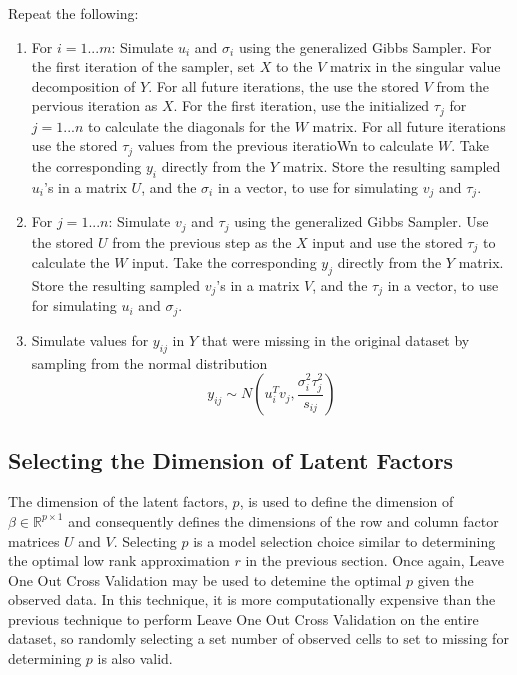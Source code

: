 \documentclass[12pt,twoside]{dukestatscithesis}
\theoremstyle{definition}
\theoremstyle{definition}
\theoremstyle{definition}
\theoremstyle{remark}
\begin{document}
Repeat the following:
\begin{enumerate}
\def\labelenumi{\arabic{enumi}.}
\item
  For \(i = 1 ... m\): Simulate \(u_i\) and \(\sigma_i\) using the
  generalized Gibbs Sampler. For the first iteration of the sampler, set
  \(X\) to the \(V\) matrix in the singular value decomposition of
  \(Y\). For all future iterations, the use the stored \(V\) from the
  pervious iteration as \(X\). For the first iteration, use the
  initialized \(\tau_j\) for \(j = 1 ... n\) to calculate the diagonals
  for the \(W\) matrix. For all future iterations use the stored
  \(\tau_j\) values from the previous iteratioWn to calculate \(W\).
  Take the corresponding \(y_i\) directly from the \(Y\) matrix. Store
  the resulting sampled \(u_i\)'s in a matrix \(U\), and the
  \(\sigma_i\) in a vector, to use for simulating \(v_j\) and
  \(\tau_j\).
\item
  For \(j = 1 ... n\): Simulate \(v_j\) and \(\tau_j\) using the
  generalized Gibbs Sampler. Use the stored \(U\) from the previous step
  as the \(X\) input and use the stored \(\tau_j\) to calculate the
  \(W\) input. Take the corresponding \(y_j\) directly from the \(Y\)
  matrix. Store the resulting sampled \(v_j\)'s in a matrix \(V\), and
  the \(\tau_j\) in a vector, to use for simulating \(u_i\) and
  \(\sigma_j\).
\item
  Simulate values for \(y_{ij}\) in \(Y\) that were missing in the
  original dataset by sampling from the normal distribution
  \[y_{ij} \sim N(u_i^Tv_j, \frac{\sigma_i^2\tau_j^2}{s_{ij}})\]
\end{enumerate}
\subsection{Selecting the Dimension of Latent
Factors}\label{selecting-the-dimension-of-latent-factors}

The dimension of the latent factors, \(p\), is used to define the
dimension of \(\beta \in \mathbb{R}^{p \times 1}\) and consequently
defines the dimensions of the row and column factor matrices \(U\) and
\(V\). Selecting \(p\) is a model selection choice similar to
determining the optimal low rank approximation \(r\) in the previous
section. Once again, Leave One Out Cross Validation may be used to
detemine the optimal \(p\) given the observed data. In this technique,
it is more computationally expensive than the previous technique to
perform Leave One Out Cross Validation on the entire dataset, so
randomly selecting a set number of observed cells to set to missing for
determining \(p\) is also valid.
\end{document}
